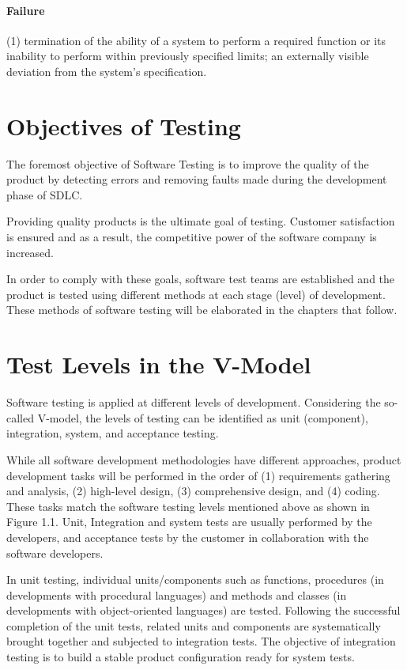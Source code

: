 \paragraph{Failure}
(1) termination of the ability of a system to perform a required function or its inability to perform within previously specified limits; an externally visible deviation from the system's specification.

\section{Objectives of Testing}
The foremost objective of Software Testing is to improve the quality of the product by detecting errors and removing faults made during the development phase of SDLC. 

Providing quality products is the ultimate goal of testing. Customer satisfaction is ensured and as a result, the competitive power of the software company is increased.

In order to comply with these goals, software test teams are established and the product is tested using different methods at each stage (level) of development. These methods of software testing will be elaborated in the chapters that follow.

\section{Test Levels in the V-Model}
Software testing is applied at different levels of development. Considering the so-called V-model, the levels of testing can be identified as unit (component), integration, system, and acceptance testing. 


While all software development methodologies have different approaches, product development tasks will be performed in the order of (1) requirements gathering and analysis, (2) high-level design, (3) comprehensive design, and (4) coding. 
These tasks match the software testing levels mentioned above as shown in Figure 1.1. Unit, Integration and system tests are usually performed by the developers, and acceptance tests by the customer in collaboration with the software developers.

In unit testing, individual units/components such as functions, procedures (in developments  with procedural languages) and  methods and classes (in developments with object-oriented languages) are tested. Following the successful completion of the unit tests, related units and components are systematically brought together and subjected to integration tests. The objective of integration testing is to build a stable product configuration ready for system tests. 

